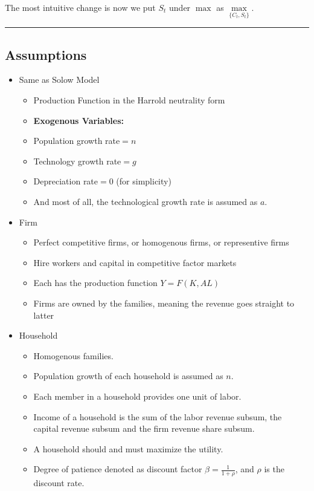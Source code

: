 \documentclass{article}
\providecommand{\tightlist}{
  \setlength{\itemsep}{0pt}
  \setlength{\parskip}{0pt}}
\newcommand*\sepline{%
  \begin{center}
    \rule[1ex]{.5\textwidth}{.5pt}
  \end{center}}
\begin{document}
The most intuitive change is now we put $S_t$ under $\max$ as $\max\limits_{\{C_t, S_t\}}$.

\sepline
\subsection{Assumptions}\label{assumptions}



\begin{itemize}
  \item Same as Solow Model
    \begin{itemize}
    \tightlist
      \item Production Function in the Harrold neutrality form 
      \item \textbf{Exogenous Variables:} 
      \item Population growth rate$=n$
      \item Technology growth rate$=g$ 
      \item Depreciation rate$=0$ (for simplicity)
      \item And most of all, the technological growth rate is assumed as $a$.
    \end{itemize}
  \item Firm
    \begin{itemize}
    \tightlist
      \item Perfect competitive firms, or homogenous firms, or representive firms
      \item Hire workers and capital in competitive factor markets
      \item Each has the production function $Y=F(K,AL)$
      \item Firms are owned by the families, meaning the revenue goes straight to
      latter
    \end{itemize}
  \item Household
    \begin{itemize}
    \tightlist
      \item Homogenous families.
      \item Population growth of each household is assumed as $n$.
      \item Each member in a household provides one unit of labor.
      \item Income of a household is the sum of the labor revenue subsum, the capital revenue subsum and the firm revenue share subsum.
      \item A household should and must maximize the utility.
      \item Degree of patience denoted as discount factor $\beta=\frac{1}{1+\rho}$, and $\rho$ is the discount rate.
    \end{itemize}
\end{itemize}
\end{document}
